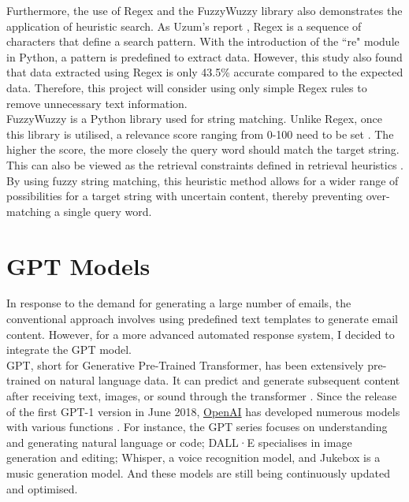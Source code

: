 \documentclass[ oneside,%
                    author={Cassie Qing Tang},
                    degree={BSc},
                     title={An Automated Response System for Disrupting Online Pet Scamming \\ },
                    subtitle={ }]{dissertation}
\begin{document}
Furthermore, the use of Regex and the FuzzyWuzzy library also demonstrates the application of heuristic search. As Uzum's report \cite{uzun_comparison_2018}, Regex is a sequence of characters that define a search pattern. With the introduction of the ``re" module in Python, a pattern is predefined to extract data. However, this study also found that data extracted using Regex is only 43.5\% accurate compared to the expected data. Therefore, this project will consider using only simple Regex rules to remove unnecessary text information. 
\\

FuzzyWuzzy is a Python library used for string matching. Unlike Regex, once this library is utilised, a relevance score ranging from 0-100 need to be set \cite{majumder_fuzzywuzzy_2021}. The higher the score, the more closely the query word should match the target string. This can also be viewed as the retrieval constraints defined in retrieval heuristics \cite{yang_secure_2021}. By using fuzzy string matching, this heuristic method allows for a wider range of possibilities for a target string with uncertain content, thereby preventing over-matching a single query word.


\section{GPT Models}
In response to the demand for generating a large number of emails, the conventional approach involves using predefined text templates to generate email content. However, for a more advanced automated response system, I decided to integrate the GPT model.
\\

GPT, short for Generative Pre-Trained Transformer, has been extensively pre-trained on natural language data. It can predict and generate subsequent content after receiving text, images, or sound through the transformer \cite{3blue1brown_but_2024}. Since the release of the first GPT-1 version in June 2018, \href{https://openai.com/}{OpenAI} has developed numerous models with various functions \cite{noauthor_openai_nodate}. For instance, the GPT series focuses on understanding and generating natural language or code; DALL·E specialises in image generation and editing; Whisper, a voice recognition model, and Jukebox is a music generation model. And these models are still being continuously updated and optimised.
\\
\end{document}
